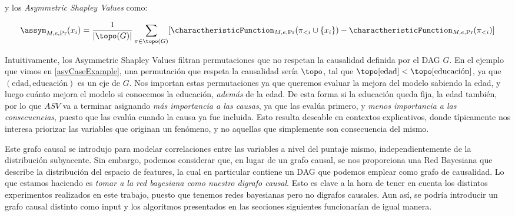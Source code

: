 y los \textit{Asymmetric Shapley Values} como:

\[
\assym_{M,e,\Pr}(x_i) = \frac{1}{|\topo(G)|} \sum_{\pi \in \topo(G)} [\charactheristicFunction_{M,e,\Pr}(\pi_{<i} \cup \{x_i\}) - \charactheristicFunction_{M,e,\Pr}(\pi_{<i})] 
\]

Intuitivamente, los Asymmetric Shapley Values filtran permutaciones que no respetan la causalidad definida por el DAG $G$. En el ejemplo que vimos en \ref{asvCaseExample}, una permutación que respeta la causalidad sería $\topo$, tal que $\topo[\text{edad}] < \topo[\text{educación}]$, ya que $(\text{edad}, \text{educación})$ es un eje de $G$. Nos importan estas permutaciones ya que queremos evaluar la mejora del modelo sabiendo la edad, y luego cuánto mejora el modelo si conocemos la educación, \emph{además} de la edad. De esta forma si la educación queda fija, la edad también, por lo que $ASV$ va a terminar asignando \emph{más importancia a las causas}, ya que las evalúa primero, y \emph{menos importancia a las consecuencias}, puesto que las evalúa cuando la causa ya fue incluida. Esto resulta deseable en contextos explicativos, donde típicamente nos interesa priorizar las variables que originan un fenómeno, y no aquellas que simplemente son consecuencia del mismo.


Este grafo causal se introdujo para modelar correlaciones entre las variables a nivel del puntaje mismo, independientemente de la distribución subyacente. Sin embargo, podemos considerar que, en lugar de un grafo causal, se nos proporciona una Red Bayesiana que describe la distribución del espacio de features, la cual en particular contiene un DAG que podemos emplear como grafo de causalidad. Lo que estamos haciendo es \emph{tomar a la red bayesiana como nuestro digrafo causal}.
Esto es clave a la hora de tener en cuenta los distintos experimentos realizados en este trabajo, puesto que tenemos redes bayesianas pero no digrafos causales. Aun así, se podría introducir un grafo causal distinto como input y los algoritmos presentados en las secciones siguientes funcionarían de igual manera. 



